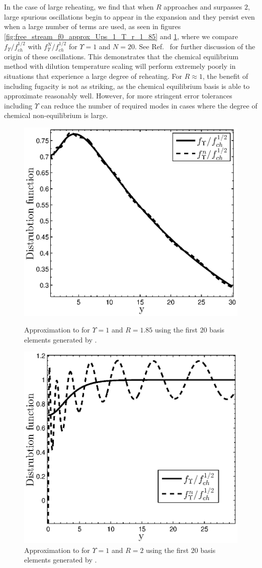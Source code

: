  In the case of large reheating, we find that when $R$ approaches and surpasses $2$, large spurious oscillations begin to appear in the expansion and they persist even when a large number of terms are used, as seen in figures  \ref{fig:free_stream_f0_approx_Ups_1_T_r_1_85} and \ref{fig:free_stream_f0_approx_Ups_1_T_r_2}, where we compare $f_\Upsilon/f_{ch}^{1/2}$ with $f_{\Upsilon}^N/f_{ch}^{1/2}$ for $\Upsilon=1$ and $N=20$. See Ref.~\cite{Birrell_orthopoly} for further discussion of the origin of these oscillations. This demonstrates that the chemical equilibrium method with dilution temperature scaling will  perform extremely poorly in situations that experience a large degree of reheating. For $R\approx 1$, the benefit of including fugacity is not as striking, as the chemical equilibrium basis is able to approximate  reasonably well.  However, for more stringent error tolerances including $\Upsilon$ can reduce the number of required modes in cases where the degree of chemical non-equilibrium is large.
\begin{figure}[H]
 \begin{minipage}[b]{0.5\linewidth}
\centerline{\includegraphics[height=6.cm]{03-birrell/SpectralMethodBoltzmann/free_stream_f0_approx_Ups_1_T_r_1_85_n_20.eps}}
\caption{Approximation to  for $\Upsilon=1$ and $R=1.85$ using the first $20$ basis elements generated by .}\label{fig:free_stream_f0_approx_Ups_1_T_r_1_85}
 \end{minipage}
 \hspace{0.5cm}
 \begin{minipage}[b]{0.5\linewidth}
\centerline{\includegraphics[height=6.cm]{03-birrell/SpectralMethodBoltzmann/free_stream_f0_approx_Ups_1_T_r_2_n_20.eps}}
\caption{Approximation to  for $\Upsilon=1$ and $R=2$ using the first $20$ basis elements generated by .}\label{fig:free_stream_f0_approx_Ups_1_T_r_2}
 \end{minipage}
 \end{figure}
